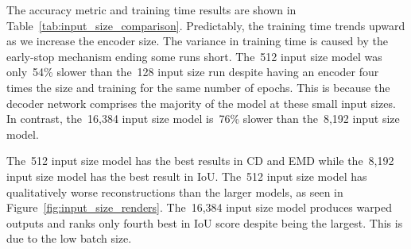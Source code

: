 The accuracy metric and training time results are shown in Table~\ref{tab:input_size_comparison}. Predictably, the training time trends upward as we increase the encoder size. The variance in training time is caused by the early-stop mechanism ending some runs short. The~512 input size model was only~54\% slower than the~128 input size run despite having an encoder four times the size and training for the same number of epochs. This is because the decoder network comprises the majority of the model at these small input sizes. In contrast, the~16,384 input size model is~76\% slower than the~8,192 input size model.

The~512 input size model has the best results in CD and EMD while the~8,192 input size model has the best result in IoU. The~512 input size model has qualitatively worse reconstructions than the larger models, as seen in Figure~\ref{fig:input_size_renders}. The~16,384 input size model produces warped outputs and ranks only fourth best in IoU score despite being the largest. This is due to the low batch size.

